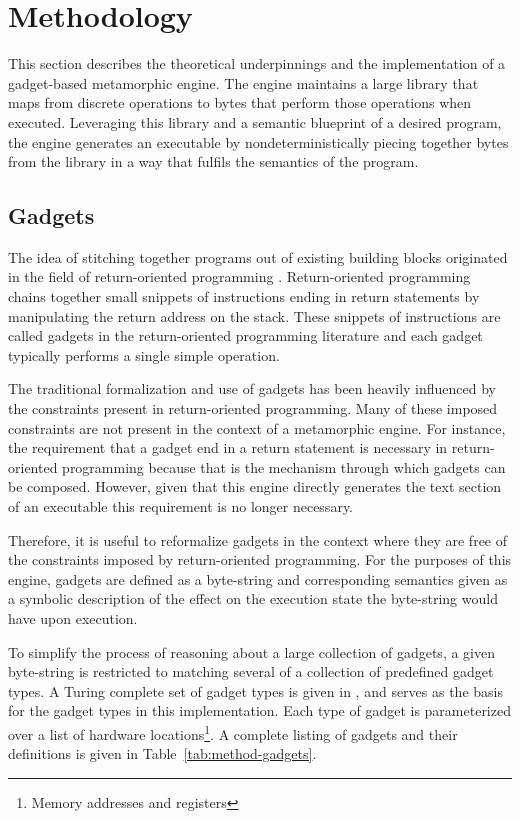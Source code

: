\chapter{Methodology}

    This section describes the theoretical underpinnings and the implementation
    of a gadget-based metamorphic engine. The engine maintains a large library
    that maps from discrete operations to bytes that perform those operations
    when executed. Leveraging this library and a semantic blueprint of a desired
    program, the engine generates an executable by nondeterministically piecing
    together bytes from the library in a way that fulfils the semantics of the
    program.

    \section{Gadgets}
    
    The idea of stitching together programs out of existing building blocks
    originated in the field of return-oriented programming \cite{rop_geo}.
    Return-oriented programming chains together small snippets of instructions
    ending in return statements by manipulating the return address on the stack.
    These snippets of instructions are called gadgets in the return-oriented
    programming literature and each gadget typically performs a single simple
    operation.

    The traditional formalization and use of gadgets has been heavily influenced
    by the constraints present in return-oriented programming. Many of these
    imposed constraints are not present in the context of a metamorphic engine.
    For instance, the requirement that a gadget end in a return statement is
    necessary in return-oriented programming because that is the mechanism
    through which gadgets can be composed. However, given that this engine
    directly generates the text section of an executable this requirement is no
    longer necessary.

    Therefore, it is useful to reformalize gadgets in the context where they are
    free of the constraints imposed by return-oriented programming. For the
    purposes of this engine, gadgets are defined as a byte-string and
    corresponding semantics given as a symbolic description of the effect on the
    execution state the byte-string would have upon execution.

    To simplify the process of reasoning about a large collection of gadgets, a
    given byte-string is restricted to matching several of a collection of
    predefined gadget types. A Turing complete set of gadget types is given in
    \cite{franken}, and serves as the basis for the gadget types in this
    implementation. Each type of gadget is parameterized over a list of hardware
    locations\footnote{Memory addresses and registers}. A complete listing of
    gadgets and their definitions is given in Table~\ref{tab:method-gadgets}.

